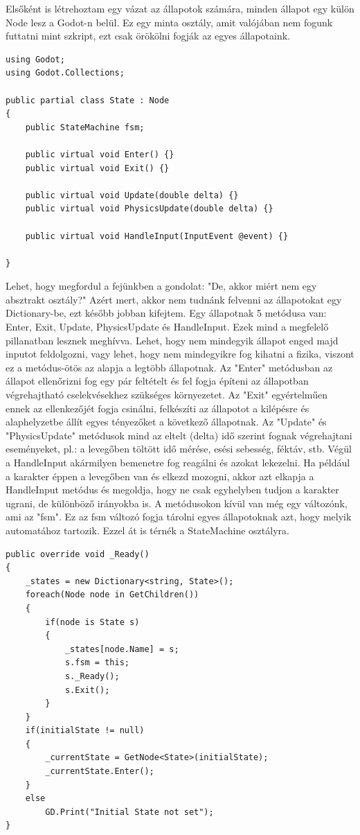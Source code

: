 Elsőként is létrehoztam egy vázat az állapotok számára, minden állapot egy külön Node lesz a Godot-n belül. Ez egy minta osztály, amit valójában nem fogunk futtatni mint szkript, ezt csak örökölni fogják az egyes állapotaink.

\lstset{style=sharpc}
\begin{lstlisting}
using Godot;
using Godot.Collections;

public partial class State : Node
{
	public StateMachine fsm;
	
	public virtual void Enter() {}
	public virtual void Exit() {}
	
	public virtual void Update(double delta) {}
	public virtual void PhysicsUpdate(double delta) {}
	
	public virtual void HandleInput(InputEvent @event) {}
	
}
\end{lstlisting}

Lehet, hogy megfordul a fejünkben a gondolat: "De, akkor miért nem egy absztrakt osztály?" Azért mert, akkor nem tudnánk felvenni az állapotokat egy Dictionary-be, ezt később jobban kifejtem. Egy állapotnak 5 metódusa van: Enter, Exit, Update, PhysicsUpdate és HandleInput. Ezek mind a megfelelő pillanatban lesznek meghívva. Lehet, hogy nem mindegyik állapot enged majd inputot feldolgozni, vagy lehet, hogy nem mindegyikre fog kihatni a fizika, viszont ez a metódus-ötös az alapja a legtöbb állapotnak. Az "Enter" metódusban az állapot ellenőrizni fog egy pár feltételt és fel fogja építeni az állapotban végrehajtható cselekvésekhez szükséges környezetet. Az "Exit" egyértelműen ennek az ellenkezőjét fogja csinálni, felkészíti az állapotot a kilépésre és alaphelyzetbe állít egyes tényezőket a következő állapotnak. Az "Update" és "PhysicsUpdate" metódusok mind az eltelt (delta) idő szerint fognak végrehajtani eseményeket, pl.: a levegőben töltött idő mérése, esési sebesség, féktáv, stb. Végül a HandleInput akármilyen bemenetre fog reagálni és azokat lekezelni. Ha például a karakter éppen a levegőben van és elkezd mozogni, akkor azt elkapja a HandleInput metódus és megoldja, hogy ne csak egyhelyben tudjon a karakter ugrani, de különböző irányokba is. A metódusokon kívül van még egy változónk, ami az "fsm". Ez az fsm változó fogja tárolni egyes állapotoknak azt, hogy melyik automatához tartozik. Ezzel át is térnék a StateMachine osztályra.

\lstset{style=sharpc}
\begin{lstlisting}
public override void _Ready()
{
	_states = new Dictionary<string, State>();
	foreach(Node node in GetChildren())
	{
		if(node is State s)
		{
			_states[node.Name] = s;
			s.fsm = this;
			s._Ready();
			s.Exit();
		}
	}
	if(initialState != null)
	{
		_currentState = GetNode<State>(initialState);
		_currentState.Enter();
	}
	else
		GD.Print("Initial State not set");
}
\end{lstlisting}

